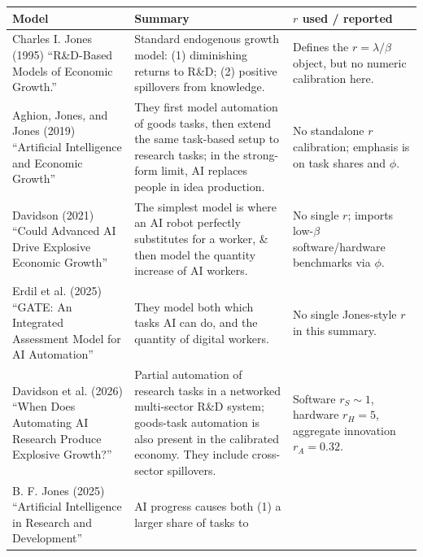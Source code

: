 \documentclass[
  11pt,
  letterpaper,
  DIV=11,
  numbers=noendperiod]{scrartcl}
\begin{document}
\begin{longtable}[]{@{}
  >{\raggedright\arraybackslash}p{}
  >{\raggedright\arraybackslash}p{}
  >{\raggedright\arraybackslash}p{}@{}}
\toprule\noalign{}
\begin{minipage}[b]{\linewidth}\raggedright
Model
\end{minipage} & \begin{minipage}[b]{\linewidth}\raggedright
Summary
\end{minipage} & \begin{minipage}[b]{\linewidth}\raggedright
\(r\) used / reported
\end{minipage} \\
\midrule\noalign{}
\endhead
\bottomrule\noalign{}
\endlastfoot
Charles I. Jones (1995) ``R\&D-Based Models of Economic Growth.'' &
Standard endogenous growth model: (1) diminishing returns to R\&D; (2)
positive spillovers from knowledge. & Defines the \(r=\lambda/\beta\)
object, but no numeric calibration here. \\
Aghion, Jones, and Jones (2019) ``Artificial Intelligence and Economic
Growth'' & They first model automation of goods tasks, then extend the
same task-based setup to research tasks; in the strong-form limit, AI
replaces people in idea production. & No standalone \(r\) calibration;
emphasis is on task shares and \(\phi\). \\
Davidson (2021) ``Could Advanced AI Drive Explosive Economic Growth'' &
The simplest model is where an AI robot perfectly substitutes for a
worker, \& then model the quantity increase of AI workers. & No single
\(r\); imports low-\(\beta\) software/hardware benchmarks via
\(\phi\). \\
Erdil et al. (2025) ``GATE: An Integrated Assessment Model for AI
Automation'' & They model both which tasks AI can do, and the quantity
of digital workers. & No single Jones-style \(r\) in this summary. \\
Davidson et al. (2026) ``When Does Automating AI Research Produce
Explosive Growth?'' & Partial automation of research tasks in a
networked multi-sector R\&D system; goods-task automation is also
present in the calibrated economy. They include cross-sector spillovers.
& Software \(r_S \sim 1\), hardware \(r_H=5\), aggregate innovation
\(r_A=0.32\). \\
B. F. Jones (2025) ``Artificial Intelligence in Research and
Development'' & AI progress causes both (1) a larger share of tasks to

\end{longtable}
\end{document}
